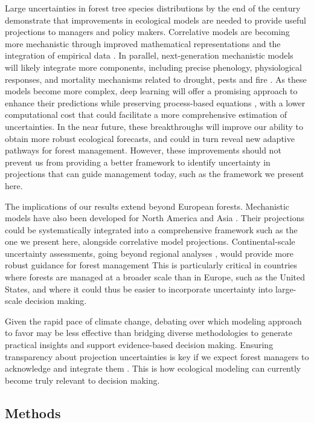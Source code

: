 \documentclass[11pt,letter]{article}
\begin{document}
Large uncertainties in forest tree species distributions by the end of the century demonstrate that improvements in ecological models are needed to provide useful projections to managers and policy makers. Correlative models are becoming more mechanistic through improved mathematical representations and the integration of empirical data \citep{Wagner2023}.%
In parallel, next-generation mechanistic models will likely integrate more components, including precise phenology, physiological responses, and mortality mechanisms related to drought, pests and fire \citep{Meyer2025, Marechaux2025}. As these models become more complex, deep learning will offer a promising approach to enhance their predictions while preserving process-based equations \citep{Kochkov2024}, with a lower computational cost that could facilitate a more comprehensive estimation of uncertainties. In the near future, these breakthroughs will improve our ability to obtain more robust ecological forecasts, and could in turn reveal new adaptive pathways for forest management. However, these improvements should not prevent us from providing a better framework to identify uncertainty in projections that can guide management today, such as the framework we present here.  

The implications of our results extend beyond European forests. Mechanistic models have also been developed for North America and Asia \citep{Morin2007, Fang2022}. Their projections could be systematically integrated into a comprehensive framework such as the one we present here, alongside correlative model projections. Continental-scale uncertainty assessments, going beyond regional analyses \citep{Iverson2016}, would provide more robust guidance for forest management  This is particularly critical in countries where forests are managed at a broader scale than in Europe, such as the United States, and where it could thus be easier to incorporate uncertainty into large-scale decision making. 

Given the rapid pace of climate change, debating over which modeling approach to favor may be less effective than bridging diverse methodologies to generate practical insights and support evidence-based decision making. Ensuring transparency about projection uncertainties is key if we expect forest managers to acknowledge and integrate them \citep{Saltelli2020}. This is how ecological modeling can currently become truly relevant to decision making.

\subsection*{Methods}
\end{document}
